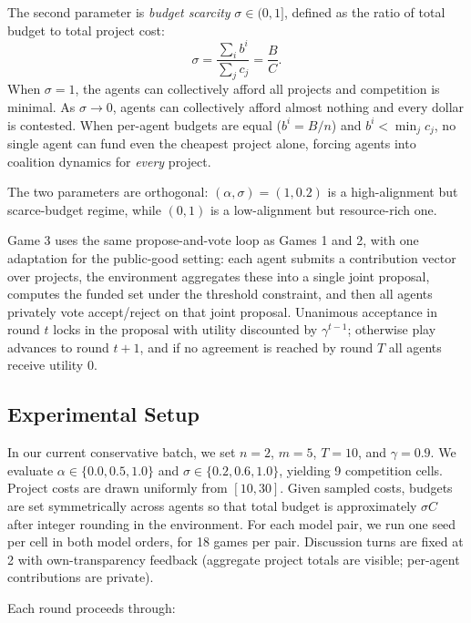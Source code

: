 The second parameter is \emph{budget scarcity} $\sigma \in (0,1]$, defined as the ratio of total budget to total project cost:
\begin{equation}
    \sigma = \frac{\sum_{i} b^i}{\sum_{j} c_j} = \frac{B}{C}.
\end{equation}
When $\sigma = 1$, the agents can collectively afford all projects and competition is minimal.
As $\sigma \to 0$, agents can collectively afford almost nothing and every dollar is contested.
When per-agent budgets are equal ($b^i = B/n$) and $b^i < \min_j c_j$, no single agent can fund even the cheapest project alone, forcing agents into coalition dynamics for \emph{every} project.

The two parameters are orthogonal: $(\alpha, \sigma) = (1, 0.2)$ is a high-alignment but scarce-budget regime, while $(0, 1)$ is a low-alignment but resource-rich one.

Game 3 uses the same propose-and-vote loop as Games 1 and 2, with one adaptation for the public-good setting: each agent submits a contribution vector over projects, the environment aggregates these into a single joint proposal, computes the funded set under the threshold constraint, and then all agents privately vote accept/reject on that joint proposal.
Unanimous acceptance in round $t$ locks in the proposal with utility discounted by $\gamma^{t-1}$; otherwise play advances to round $t+1$, and if no agreement is reached by round $T$ all agents receive utility 0.

\subsection{Experimental Setup}
\label{sec:game_3_experimental_setup}

In our current conservative batch, we set $n = 2$, $m = 5$, $T = 10$, and $\gamma = 0.9$.
We evaluate $\alpha \in \{0.0, 0.5, 1.0\}$ and $\sigma \in \{0.2, 0.6, 1.0\}$, yielding 9 competition cells.
Project costs are drawn uniformly from $[10, 30]$.
Given sampled costs, budgets are set symmetrically across agents so that total budget is approximately $\sigma C$ after integer rounding in the environment.
For each model pair, we run one seed per cell in both model orders, for 18 games per pair.
Discussion turns are fixed at 2 with own-transparency feedback (aggregate project totals are visible; per-agent contributions are private).

Each round proceeds through:

